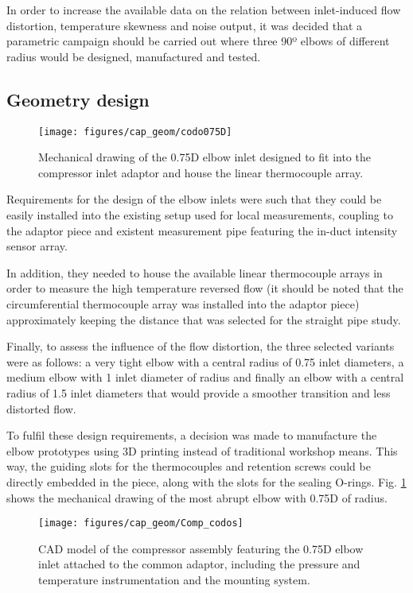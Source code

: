 In order to increase the available data on the relation between inlet-induced flow distortion, temperature skewness and noise output, it was decided that a parametric campaign should be carried out where three 90º elbows of different radius would be designed, manufactured and tested.

\subsection{Geometry design}

\begin{figure}[h!]
\centering
\texttt{[image: figures/cap\_geom/codo075D]}
\caption{Mechanical drawing of the 0.75D elbow inlet designed to fit into the compressor inlet adaptor and house the linear thermocouple array.}
\label{fig:codo075D}
\end{figure}

Requirements for the design of the elbow inlets were such that they could be easily installed into the existing setup used for local measurements, coupling to the adaptor piece and existent measurement pipe featuring the in-duct intensity sensor array.

In addition, they needed to house the available linear thermocouple arrays in order to measure the high temperature reversed flow (it should be noted that the circumferential thermocouple array was installed into the adaptor piece) approximately keeping the distance that was selected for the straight pipe study.

Finally, to assess the influence of the flow distortion, the three selected variants were as follows: a very tight elbow with a central radius of 0.75 inlet diameters, a medium elbow with 1 inlet diameter of radius and finally an elbow with a central radius of 1.5 inlet diameters that would provide a smoother transition and less distorted flow.

To fulfil these design requirements, a decision was made to manufacture the elbow prototypes using 3D printing instead of traditional workshop means. This way, the guiding slots for the thermocouples and retention screws could be directly embedded in the piece, along with the slots for the sealing O-rings. Fig. \ref{fig:codo075D} shows the mechanical drawing of the most abrupt elbow with 0.75D of radius.

\begin{figure}[h!]
\centering
\texttt{[image: figures/cap\_geom/Comp\_codos]}
\caption{CAD model of the compressor assembly featuring the 0.75D elbow inlet attached to the common adaptor, including the pressure and temperature instrumentation and the mounting system.}
\label{fig:Comp_codos}
\end{figure}


